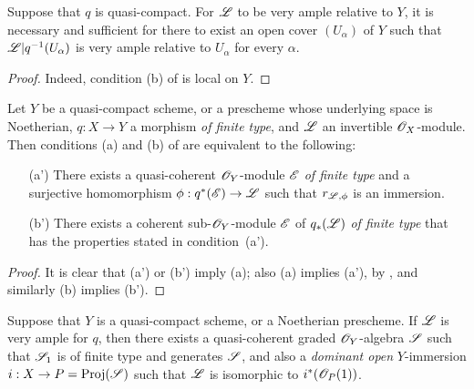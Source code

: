 \begin{corollary}[4.4.5]
\label{II.4.4.5}
Suppose that $q$ is quasi-compact.
For $\mathscr{L}$ to be very ample relative to $Y$, it is necessary and sufficient for there to exist an open cover $(U_\alpha)$ of $Y$ such that $\mathscr{L}|q^{-1}(U_\alpha)$ is very ample relative to $U_\alpha$ for every $\alpha$.
\end{corollary}

\begin{proof}
Indeed, condition (b) of  is local on $Y$.
\end{proof}

\begin{proposition}[4.4.6]
\label{II.4.4.6}
Let $Y$ be a quasi-compact scheme, or a prescheme whose underlying space is Noetherian, $q:X\to Y$ a morphism \emph{of finite type}, and $\mathscr{L}$ an invertible $\mathscr{O}_X$-module.
Then conditions (a) and (b) of  are equivalent to the following:
\begin{enumerate}
  \item[\rm{(a')}] There exists a quasi-coherent $\mathscr{O}_Y$-module $\mathscr{E}$ \emph{of finite type} and a surjective homomorphism $\vphi:q^*(\sh{E})\to\sh{L}$ such that $r_{\mathscr{L},\phi}$ is an immersion.
  \item[\rm{(b')}] There exists a coherent sub-$\mathscr{O}_Y$-module $\mathscr{E}$ of $q_*(\mathscr{L})$ \emph{of finite type} that has the properties stated in condition~(a').
\end{enumerate}
\end{proposition}

\begin{proof}
It is clear that (a') or (b') imply (a);
also (a) implies (a'), by , and similarly (b) implies (b').
\end{proof}

\begin{corollary}[4.4.7]
\label{II.4.4.7}
Suppose that $Y$ is a quasi-compact scheme, or a Noetherian prescheme.
If $\mathscr{L}$ is very ample for $q$, then there exists a quasi-coherent graded $\mathscr{O}_Y$-algebra $\mathscr{S}$ such that $\mathscr{S}_1$ is of finite type and generates $\mathscr{S}$, and also a \emph{dominant open} $Y$-immersion $i:X\to P=\Proj(\sh{S})$ such that $\mathscr{L}$ is isomorphic to $i^*(\mathscr{O}_P(1))$.
\end{corollary}

